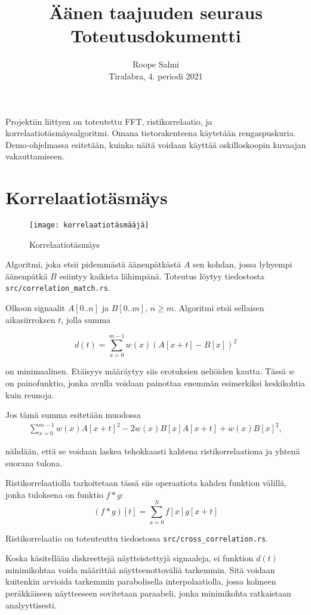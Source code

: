 \documentclass[11pt,oneside,a4paper]{memoir}
\title{Äänen taajuuden seuraus\\ Toteutusdokumentti}
\author{Roope Salmi\\ Tiralabra, 4. periodi 2021}
\date{}
\begin{document}
\maketitle

Projektiin liittyen on toteutettu FFT, ristikorrelaatio, ja korrelaatiotäsmäysalgoritmi.
Omana tietorakenteena käytetään rengaspuskuria.
Demo-ohjelmassa esitetään, kuinka näitä voidaan käyttää oskilloskoopin kuvaajan vakauttamiseen.

\section*{Korrelaatiotäsmäys}
\begin{figure}
\centering
\texttt{[image: korrelaatiotäsmääjä]}
\caption{Korrelaatiotäsmäys}
\label{fig:korrelaatio}
\end{figure}

Algoritmi, joka etsii pidemmästä äänenpätkästä $A$ sen kohdan, jossa
lyhyempi äänenpätkä $B$ esiintyy kaikista lähimpänä. Toteutus löytyy tiedostosta
\texttt{src/correlation\_match.rs}.

Olkoon signaalit $A[0..n]$ ja $B[0..m]$, $n \ge m$.
Algoritmi etsii sellaisen aikasiirroksen $t$, jolla summa

\[
d(t) = \sum_{x=0}^{m-1} w(x) (A[x+t] - B[x])^2
\]

on minimaalinen. Etäisyys määräytyy siis erotuksien neliöiden kautta.
Tässä $w$ on painofunktio, jonka avulla voidaan painottaa enemmän esimerkiksi
keskikohtia kuin reunoja.

\clearpage
Jos tämä summa esitetään muodossa
\begin{align*}
\sum_{x=0}^{m-1} w(x) A[x+t]^2 - 2w(x) B[x] A[x+t] + w(x) B[x]^2,
\end{align*}

nähdään, että se voidaan laskea tehokkaasti kahtena ristikorrelaationa ja yhtenä suorana tulona.

Ristikorrelaatiolla tarkoitetaan tässä siis operaatiota kahden funktion välillä, jonka
tuloksena on funktio $f * g$:
\[
(f * g)[t] = \sum_{x=0}^{N} f[x] g[x+t]
\]

Ristikorrelaatio on toteuteuttu tiedostossa \texttt{src/cross\_correlation.rs}.

Koska käsitellään diskreettejä näytteistettyjä signaaleja, ei funktion $d(t)$
minimikohtaa voida määrittää näytteenottoväliä tarkemmin.
Sitä voidaan kuitenkin arvioida tarkemmin parabolisella interpolaatiolla, jossa
kolmeen peräkkäiseen näytteeseen sovitetaan paraabeli, jonka minimikohta
ratkaistaan analyyttisesti.
\end{document}

